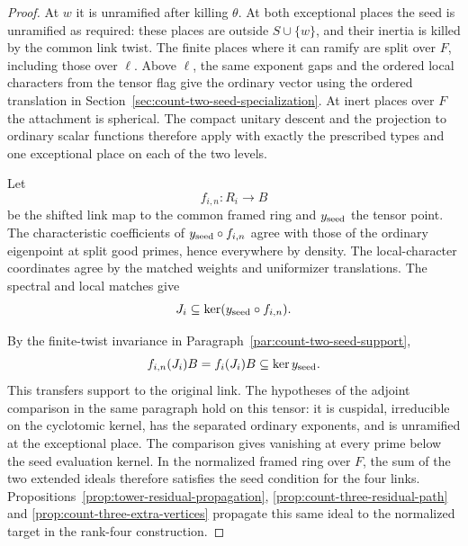 \begin{proof}
At \(w\) it is unramified
after killing \(\theta\). At both exceptional places the
seed is unramified as required: these places are outside
\(S\cup\{w\}\), and their inertia is killed by the common
link twist. The finite places where it can ramify are
split over \(F\), including those over \(\ell\).
Above \(\ell\), the same exponent gaps and the ordered
local characters from the tensor flag give the ordinary
vector using the ordered translation in
Section~\ref{sec:count-two-seed-specialization}.
At inert places over \(F\) the attachment is spherical.
The compact unitary descent and the projection to
ordinary scalar functions therefore apply with exactly
the prescribed types and one exceptional place on each
of the two levels.
\cite{thorne-unitary-descent,newton-thorne-unitary}\label{cor:ordinary-count-iii-admission-4}

Let
\[
 f_{i,n}:R_i\to B
\]
be the shifted link map to the
common framed ring and \(y_{\rm seed}\) the tensor point.
The characteristic coefficients of \(y_{\rm seed}\circ f_{i,n}\)
agree with those of the ordinary eigenpoint at split good
primes, hence everywhere by density. The local-character
coordinates agree by the matched weights and uniformizer
translations. The spectral and local matches give
\[
 J_i\subseteq\ker(y_{\rm seed}\circ f_{i,n}).
\]

By the finite-twist invariance in
Paragraph~\ref{par:count-two-seed-support},
\[
                  f_{i,n}(J_i)B=f_i(J_i)B
                             \subseteq\ker y_{\rm seed}.
\]
This transfers support to the original link. The hypotheses of the adjoint comparison in the same
paragraph hold on this tensor: it is cuspidal, irreducible
on the cyclotomic kernel, has the separated ordinary
exponents, and is unramified at the exceptional place.
The comparison gives vanishing at every prime below
the seed evaluation kernel. In the normalized framed
ring over \(F\), the sum of the two extended ideals therefore
satisfies the seed condition for the four links.
Propositions~\ref{prop:tower-residual-propagation},
\ref{prop:count-three-residual-path} and
\ref{prop:count-three-extra-vertices} propagate this same ideal
to the normalized target in the rank-four construction.
\end{proof}
